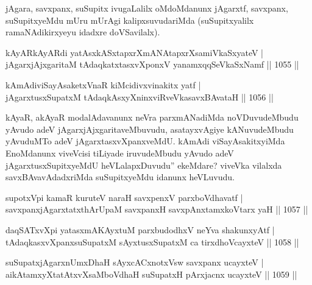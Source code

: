 \begin{artha}
jAgara, savxpanx, suSupitx ivugaLalilx oMdoMdanunx jAgarxtf, savxpanx, suSupitxyeMdu mUru mUrAgi kalipxsuvudariMda (suSupitxyalilx ramaNAdikirxyeyu idadxre doVSavilalx).
\end{artha}


\begin{shl}
kAyARkAyARdi yatAsxkASxtapxrXmANAtapxrXsamiVkaSxyateV | \\
jAgarxjAjxgaritaM tAdaqkatxtasxvXponxV yanamxqqSeVkaSxNamf \hfill||  1055 ||  
\end{shl}
				
\begin{shl}
kAmAdiviSayAsaketxVnaR kiMcidivxvinakitx yatf | \\
jAgarxtusxSupatxM tAdaqkAsxyXninxviRveVkasavxBAvataH \hfill||  1056 ||  
\end{shl}

\begin{artha}
kAyaR, akAyaR modalAdavanunx neVra parxmANadiMda noVDuvudeMbudu yAvudo adeV jAgarxjAjxgaritaveMbuvudu, asatayxvAgiye kANuvudeMbudu yAvuduMTo adeV jAgarxtasxvXpanxveMdU. kAmAdi viSayAsakitxyiMda EnoMdanunx viveVcisi tiLiyade iruvudeMbudu yAvudo adeV jAgarxtusxSupitxyeMdU heVLalapxDuvudu'' ekeMdare? viveVka vilalxda savxBAvavAdadxriMda suSupitxyeMdu idanunx heVLuvudu.
\end{artha}


\begin{shl}
supotxV\s pi kamaR kuruteV naraH savxpenxV parxboVdhavatf | \\
savxpanxjAgarxtatxthArUpaM savxpanxH savxpAnxtamxkoV\s tarx yaH \hfill||  1057 ||  
\end{shl}
				
\begin{shl}
daqSATxvX\s pi yatasxmAKAyxtuM parxbudodhxV neYva shakunxyAtf | \\
tAdaqkasxvXpanxsuSupatxM sAyxtusxSupatxM ca tirxdhoVcayxteV \hfill||  1058 ||  
\end{shl}
				
\begin{shl}
suSupatxjAgarxnUmxDhaH sAyxcACxnotxV\s sw savxpanx ucayxteV | \\
aikAtamxyXtatAtxvXsaMboVdhaH suSupatxH pArxjacnx ucayxteV \hfill||  1059 ||  
\end{shl}

